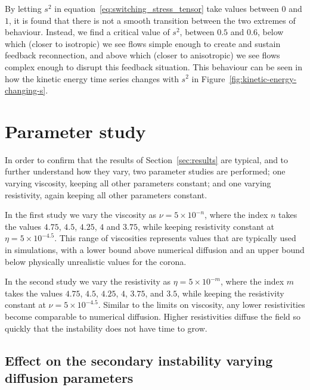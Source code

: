 By letting $s^2$ in equation~\eqref{eq:switching_stress_tensor} take values between $0$ and $1$, it is found that there is not a smooth transition between the two extremes of behaviour. Instead, we find a critical value of $s^2$, between $0.5$ and $0.6$, below which (closer to isotropic) we see flows simple enough to create and sustain feedback reconnection, and above which (closer to anisotropic) we see flows complex enough to disrupt this feedback situation. This behaviour can be seen in how the kinetic energy time series changes with $s^2$ in Figure~\ref{fig:kinetic-energy-changing-s}.

\section{Parameter study}
\label{sec:results2}

In order to confirm that the results of Section~\ref{sec:results} are typical, and to further understand how they vary, two parameter studies are performed; one varying viscosity, keeping all other parameters constant; and one varying resistivity, again keeping all other parameters constant. 

In the first study we vary the viscosity as $\nu = 5 \times 10^{-n}$, where the index $n$ takes the values $4.75$, $4.5$, $4.25$, $4$ and $3.75$, while keeping resistivity constant at $\eta = 5\times10^{-4.5}$. This range of viscosities represents values that are typically used in simulations, with a lower bound above numerical diffusion and an upper bound below physically unrealistic values for the corona.

In the second study we vary the resistivity as $\eta = 5 \times 10^{-m}$, where the index $m$ takes the values $4.75$, $4.5$, $4.25$, $4$, $3.75$, and $3.5$, while keeping the resistivity constant at $\nu = 5\times 10^{-4.5}$. Similar to the limits on viscosity, any lower resistivities become comparable to numerical diffusion. Higher resistivities diffuse the field so quickly that the instability does not have time to grow.

\subsection{Effect on the secondary instability varying diffusion parameters}
\label{sec:secondary_instability}

